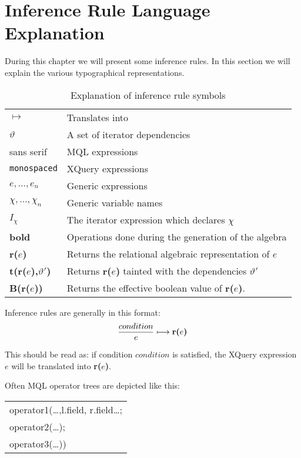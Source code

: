\section{Inference Rule Language Explanation}
\label{sect:trans:TD:langExpl}
During this chapter we will present some inference rules. In this section we will explain the various
typographical representations.

\begin{table}[h]
\centering
\begin{tabular}{l|l}

  $\longmapsto$  			& Translates into \\
  $\vartheta$ 				& A set of iterator dependencies \\
  \textsf{sans serif} 		& MQL expressions \\
  \texttt{monospaced} 		& XQuery expressions \\
  $e,\ldots,e_{n}$			& Generic expressions \\
  $\chi,\ldots,\chi_{n}$	& Generic variable names \\
  $I_{\chi}$				& The iterator expression which declares $\chi$ \\
  \textbf{bold} 			& Operations done during the generation of the algebra \\
  \textbf{r(}$e$\textbf{)} 	& Returns the relational algebraic representation of $e$   \\
  \textbf{t(}\textbf{r(}$e$\textbf{)}\textbf{,}$\vartheta'$\textbf{)} & Returns \textbf{r(}$e$\textbf{)} tainted
  with the dependencies $\vartheta'$ \\
  \textbf{B(r(}$e$\textbf{))} & Returns the effective boolean value of \textbf{r(}$e$\textbf{)}.
  
\end{tabular}
\caption{Explanation of inference rule symbols}
\label{tab:trans:td:langExpl}
\end{table}

Inference rules are generally in this format:
\begin{equation*}
\frac{condition}{e}\longmapsto \mbox{\textbf{r(}}e\mbox{\textbf{)}}
\end{equation*}

This should be read as: if condition $condition$ is satisfied, the XQuery expression $e$ will be translated into
\textbf{r(}$e$\textbf{)}.

Often MQL operator trees are depicted like this:
\begin{center}
\begin{tabular}{l}
\textsf{operator1(\ldots,l.field, r.field\ldots; } \\ \quad
\textsf{operator2(\ldots);} \\ \quad
\textsf{operator3(\ldots))}
\end{tabular}
\end{center}

